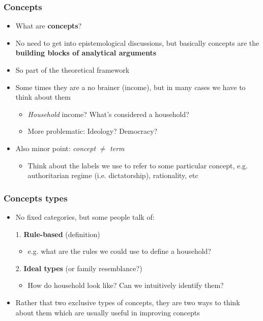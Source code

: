 \documentclass[aspectratio=43]{beamer}
\begin{document}
\begin{frame}
\frametitle{Concepts}
\centering

\begin{itemize}
  \item What are \textbf{concepts}?
  \item No need to get into epistemological discussions, but basically concepts are the \textbf{building blocks of analytical arguments}
  \item So part of the theoretical framework
  \item[]
  \item<2-> Some times they are a no brainer (income), but in many cases we have to think about them
  \begin{itemize}
    \item \textit{Household} income? What's considered a household?
    \item More problematic: Ideology? Democracy?
  \end{itemize}
  \item<3-> Also minor point: \textit{concept} $\neq$ \textit{term}
  \begin{itemize}
    \item Think about the labels we use to refer to some particular concept, e.g. authoritarian regime (i.e. dictatorship), rationality, etc
  \end{itemize}
\end{itemize}


\end{frame}

\begin{frame}
\frametitle{Concepts types}
\centering

\begin{itemize}
  \item No fixed categories, but some people talk of:
  \item[1.] \textbf{Rule-based} (definition)
  \begin{itemize}
    \item e.g. what are the rules we could use to define a household?
  \end{itemize}
  \item[2.] \textbf{Ideal types} (or family resemblance?)
  \begin{itemize}
    \item How do household look like? Can we intuitively identify them?
  \end{itemize}
  \item Rather that two exclusive types of concepts, they are two ways to think about them which are usually useful in improving concepts
\end{itemize}

\end{frame}
\end{document}
